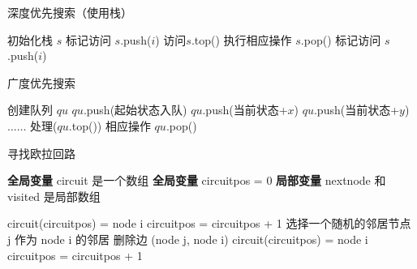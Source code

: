\documentclass{article}
\begin{document}
\begin{algorithm}
\caption{深度优先搜索（使用栈）}
\label{alg:dfs-stack}
\begin{algorithmic}
\State 初始化栈 $s$
        \State 标记访问
        \State $s$.push($i$) 
    \EndIf
\EndFor
{} 
    \State 访问$s$.top() 
    \State 执行相应操作
    \State $s$.pop() 
            \State 标记访问
            \State $s$.push($i$) 
        \EndIf
    \EndFor
\EndWhile
\end{algorithmic}
\end{algorithm}


\begin{algorithm}
\caption{广度优先搜索}
\label{alg:bfs}
\begin{algorithmic}
\State 创建队列 $qu$
\State $qu$.push(起始状态入队)
 
        \State $qu$.push(当前状态+$x$) 
    \EndIf
        \State $qu$.push(当前状态+$y$) 
    \EndIf
    \State $\ldots\ldots$ 
    \State 处理($qu$.top())
    \State 相应操作
    \State $qu$.pop() 
\EndWhile
\end{algorithmic}
\end{algorithm}


\begin{algorithm}
\caption{寻找欧拉回路}
\label{alg:euler-circuit}
\begin{algorithmic}
\State \textbf{全局变量} circuit 是一个数组
\State \textbf{全局变量} circuitpos = 0
    \State \textbf{局部变量} nextnode 和 visited 是局部数组
    \State {}
\EndFunction

        \State circuit(circuitpos) = node i
        \State circuitpos = circuitpos + 1
    \Else
            \State 选择一个随机的邻居节点 j 作为 node i 的邻居
            \State 删除边 (node j, node i)
            \State {}
            \State circuit(circuitpos) = node i
            \State circuitpos = circuitpos + 1
        \EndWhile
    \EndIf
\EndFunction
\end{algorithmic}
\end{algorithm}
\end{document}

